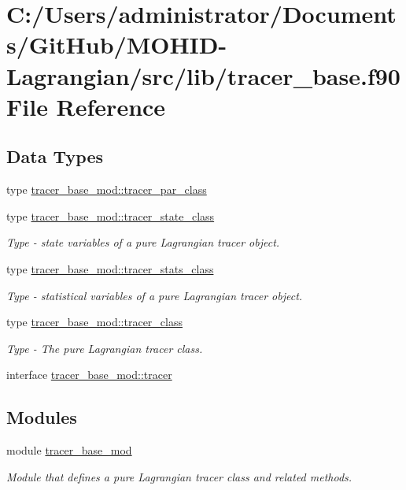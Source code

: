 \hypertarget{tracer__base_8f90}{}\section{C\+:/\+Users/administrator/\+Documents/\+Git\+Hub/\+M\+O\+H\+I\+D-\/\+Lagrangian/src/lib/tracer\+\_\+base.f90 File Reference}
\label{tracer__base_8f90}
\subsection*{Data Types}
\begin{DoxyCompactItemize}
\item 
type \mbox{\hyperlink{structtracer__base__mod_1_1tracer__par__class}{tracer\+\_\+base\+\_\+mod\+::tracer\+\_\+par\+\_\+class}}
\item 
type \mbox{\hyperlink{structtracer__base__mod_1_1tracer__state__class}{tracer\+\_\+base\+\_\+mod\+::tracer\+\_\+state\+\_\+class}}
\begin{DoxyCompactList}\small\item\em Type -\/ state variables of a pure Lagrangian tracer object. \end{DoxyCompactList}\item 
type \mbox{\hyperlink{structtracer__base__mod_1_1tracer__stats__class}{tracer\+\_\+base\+\_\+mod\+::tracer\+\_\+stats\+\_\+class}}
\begin{DoxyCompactList}\small\item\em Type -\/ statistical variables of a pure Lagrangian tracer object. \end{DoxyCompactList}\item 
type \mbox{\hyperlink{structtracer__base__mod_1_1tracer__class}{tracer\+\_\+base\+\_\+mod\+::tracer\+\_\+class}}
\begin{DoxyCompactList}\small\item\em Type -\/ The pure Lagrangian tracer class. \end{DoxyCompactList}\item 
interface \mbox{\hyperlink{interfacetracer__base__mod_1_1tracer}{tracer\+\_\+base\+\_\+mod\+::tracer}}
\end{DoxyCompactItemize}
\subsection*{Modules}
\begin{DoxyCompactItemize}
\item 
module \mbox{\hyperlink{namespacetracer__base__mod}{tracer\+\_\+base\+\_\+mod}}
\begin{DoxyCompactList}\small\item\em Module that defines a pure Lagrangian tracer class and related methods. \end{DoxyCompactList}\end{DoxyCompactItemize}
